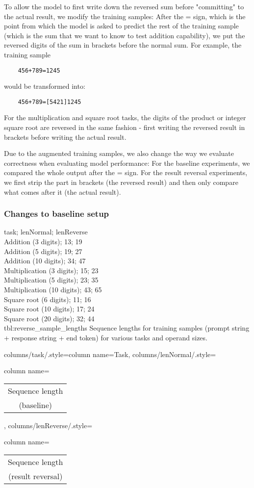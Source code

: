 To allow the model to first write down the reversed sum before "committing" to the actual result, we modify the training samples: After the = sign, which is the point from which the model is asked to predict the rest of the training sample (which is the sum that we want to know to test addition capability), we put the reversed digits of the sum in brackets before the normal sum.
For example, the training sample

\begin{lstlisting}
    456+789=1245
\end{lstlisting}

\noindent
would be transformed into:

\begin{lstlisting}
    456+789=[5421]1245
\end{lstlisting}

For the multiplication and square root tasks, the digits of the product or integer square root are reversed in the same fashion - first writing the reversed result in brackets before writing the actual result.

\noindent
Due to the augmented training samples, we also change the way we evaluate correctness when evaluating model performance: For the baseline experiments, we compared the whole output after the = sign. For the result reversal experiments, we first strip the part in brackets (the reversed result) and then only compare what comes after it (the actual result).

\subsubsection{Changes to baseline setup}

{
    task; lenNormal; lenReverse\\
    Addition (3 digits); 13; 19 \\
    Addition (5 digits); 19; 27 \\
    Addition (10 digits); 34; 47 \\
    Multiplication (3 digits); 15; 23 \\
    Multiplication (5 digits); 23; 35 \\
    Multiplication (10 digits); 43; 65 \\
    Square root (6 digits); 11; 16 \\
    Square root (10 digits); 17; 24 \\
    Square root (20 digits); 32; 44 \\
}
{tbl:reverse_sample_lengths}
{
    Sequence lengths for training samples (prompt string + response string + end token) for various tasks and operand sizes.
}
{%
    columns/task/.style={column name={Task}},
    columns/lenNormal/.style={column name={\begin{tabular}{c} Sequence length \\ (baseline) \\ \end{tabular}}},
    columns/lenReverse/.style={column name={\begin{tabular}{c} Sequence length \\ (result reversal) \\ \end{tabular}}}
}

